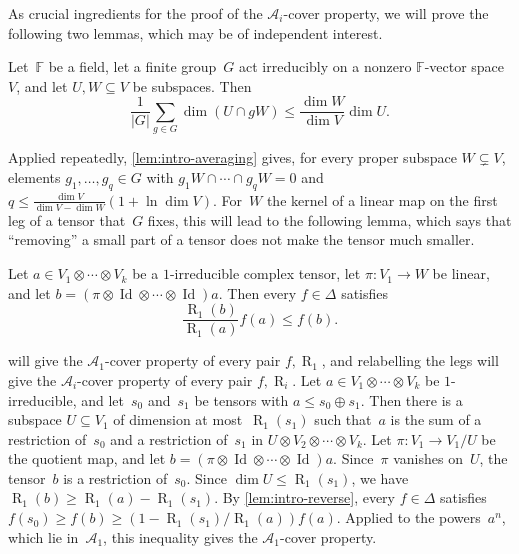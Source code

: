 \documentclass[11pt,letterpaper]{article}
\DeclareMathOperator{\tensorrank}{R}
\newcommand{\FF}{\mathbb{F}}
\DeclareMathOperator{\Id}{Id}
\begin{document}
As crucial ingredients for the proof of the \(\mathcal{A}_i\)-cover property, we will prove the following two lemmas, which may be of independent interest.

\begin{lemma}\label{lem:intro-averaging}
Let~\(\FF\) be a field, let a finite group~\(G\) act irreducibly on a nonzero \(\FF\)-vector space~\(V\), and let \(U,W\subseteq V\) be subspaces. Then
\[
\frac{1}{|G|}\sum_{g\in G}\dim(U\cap gW)\leq\frac{\dim W}{\dim V}\dim U.
\]
\end{lemma}

Applied repeatedly, \cref{lem:intro-averaging} gives, for every proper subspace \(W\subsetneq V\), elements \(g_1,\ldots,g_q\in G\) with \(g_1W\cap\cdots\cap g_qW=0\) and \(q\leq\frac{\dim V}{\dim V-\dim W}(1+\ln\dim V)\). For~\(W\) the kernel of a linear map on the first leg of a tensor that~\(G\) fixes, this will lead to the following lemma, which says that ``removing'' a small part of a tensor does not make the tensor much smaller. 

\begin{lemma}\label{lem:intro-reverse}
Let \(a\in V_1\otimes\cdots\otimes V_k\) be a \(1\)-irreducible complex tensor, let \(\pi:V_1\to W\) be linear, and let \(b=(\pi\otimes\Id\otimes\cdots\otimes\Id)a\). Then every \(f\in\Delta\) satisfies
\[
\frac{\tensorrank_1(b)}{\tensorrank_1(a)}f(a)\leq f(b).
\]
\end{lemma}

 will give the \(\mathcal{A}_1\)-cover property of every pair \(f,\tensorrank_1\), and relabelling the legs will give the \(\mathcal{A}_i\)-cover property of every pair \(f,\tensorrank_i\). Let \(a\in V_1\otimes\cdots\otimes V_k\) be \(1\)-irreducible, and let~\(s_0\) and~\(s_1\) be tensors with \(a\leq s_0\oplus s_1\). Then there is a subspace \(U\subseteq V_1\) of dimension at most~\(\tensorrank_1(s_1)\) such that~\(a\) is the sum of a restriction of~\(s_0\) and a restriction of~\(s_1\) in \(U\otimes V_2\otimes\cdots\otimes V_k\). Let \(\pi:V_1\to V_1/U\) be the quotient map, and let \(b=(\pi\otimes\Id\otimes\cdots\otimes\Id)a\). Since~\(\pi\) vanishes on~\(U\), the tensor~\(b\) is a restriction of~\(s_0\). Since \(\dim U\leq\tensorrank_1(s_1)\), we have \(\tensorrank_1(b)\geq\tensorrank_1(a)-\tensorrank_1(s_1)\). By \cref{lem:intro-reverse}, every \(f\in\Delta\) satisfies \(f(s_0)\geq f(b)\geq(1-\tensorrank_1(s_1)/\tensorrank_1(a))f(a)\). Applied to the powers~\(a^n\), which lie in~\(\mathcal{A}_1\), this inequality gives the \(\mathcal{A}_1\)-cover property.
\end{document}
